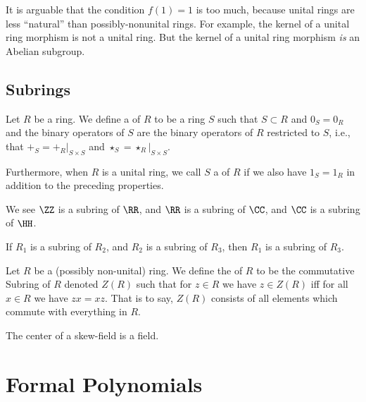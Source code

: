 \begin{remark}
It is arguable that the condition $f(1)=1$ is too much, because unital
rings are less ``natural'' than possibly-nonunital rings. For example,
the kernel of a unital ring morphism is not a unital ring. But the
kernel of a unital ring morphism \emph{is} an Abelian subgroup.
\end{remark}

\subsection{Subrings}

\begin{definition}[Subrings]
Let $R$ be a ring. We define a  of $R$ to be a ring
$S$ such that $S\subset R$ and $0_{S}=0_{R}$ and the binary operators
of $S$ are the binary operators of $R$ restricted to $S$, i.e., that
$+_{S} = +_{R}|_{S\times S}$ and  $\star_{S} = \star_{R}|_{S\times S}$.

Furthermore, when $R$ is a unital ring, we call $S$ a  
of $R$ if we also have $1_{S}=1_{R}$ in addition to the preceding
properties. 
\end{definition}

\begin{example}
We see $\ZZ$ is a subring of $\RR$, and $\RR$ is a subring of $\CC$,
and $\CC$ is a subring of $\HH$.
\end{example}

\begin{theorem}
If $R_{1}$ is a subring of $R_{2}$, and $R_{2}$ is a subring of
$R_{3}$, then $R_{1}$ is a subring of $R_{3}$.
\end{theorem}

\begin{definition}
Let $R$ be a (possibly non-unital) ring. We define the  of $R$
to be the commutative Subring of $R$ denoted $Z(R)$ such that
for $z\in R$ we have $z\in Z(R)$ iff for all $x\in R$ we have $zx=xz$.
That is to say, $Z(R)$ consists of all elements which commute with
everything in $R$.
\end{definition}

\begin{theorem}
The center of a skew-field is a field.
\end{theorem}

\section{Formal Polynomials}

